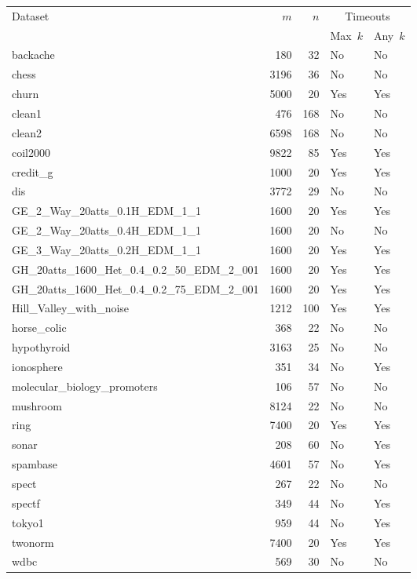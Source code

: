 \documentclass{article}
\theoremstyle{definition}
\begin{document}
\begin{table}[p]
	\centering
	\begin{tabular}{lrrll}
		\toprule
		\multirow{2}{*}{Dataset} & \multirow{2}{*}{$m$} & \multirow{2}{*}{$n$} & \multicolumn{2}{c}{Timeouts} \\
		\cmidrule(lr){4-5}
		& & & Max~$k$ & Any~$k$ \\
		\midrule
		backache & 180 & 32 & No & No \\
		chess & 3196 & 36 & No & No \\
		churn & 5000 & 20 & Yes & Yes \\
		clean1 & 476 & 168 & No & No \\
		clean2 & 6598 & 168 & No & No \\
		coil2000 & 9822 & 85 & Yes & Yes \\
		credit\_g & 1000 & 20 & Yes & Yes \\
		dis & 3772 & 29 & No & No \\
		GE\_2\_Way\_20atts\_0.1H\_EDM\_1\_1 & 1600 & 20 & Yes & Yes \\
		GE\_2\_Way\_20atts\_0.4H\_EDM\_1\_1 & 1600 & 20 & No & No \\
		GE\_3\_Way\_20atts\_0.2H\_EDM\_1\_1 & 1600 & 20 & Yes & Yes \\
		GH\_20atts\_1600\_Het\_0.4\_0.2\_50\_EDM\_2\_001 & 1600 & 20 & Yes & Yes \\
		GH\_20atts\_1600\_Het\_0.4\_0.2\_75\_EDM\_2\_001 & 1600 & 20 & Yes & Yes \\
		Hill\_Valley\_with\_noise & 1212 & 100 & Yes & Yes \\
		horse\_colic & 368 & 22 & No & No \\
		hypothyroid & 3163 & 25 & No & No \\
		ionosphere & 351 & 34 & No & Yes \\
		molecular\_biology\_promoters & 106 & 57 & No & No \\
		mushroom & 8124 & 22 & No & No \\
		ring & 7400 & 20 & Yes & Yes \\
		sonar & 208 & 60 & No & Yes \\
		spambase & 4601 & 57 & No & Yes \\
		spect & 267 & 22 & No & No \\
		spectf & 349 & 44 & No & Yes \\
		tokyo1 & 959 & 44 & No & Yes \\
		twonorm & 7400 & 20 & Yes & Yes \\
		wdbc & 569 & 30 & No & No \\

\end{tabular}
\end{table}
\end{document}
